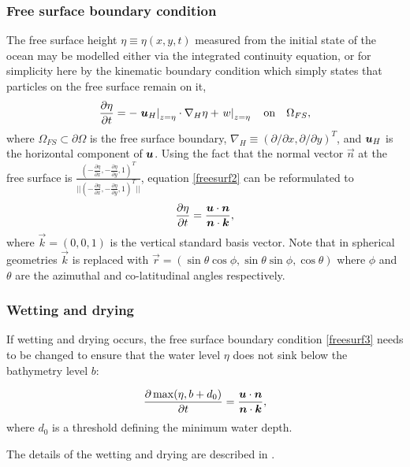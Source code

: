 \subsubsection{Free surface boundary condition}\label{sec:FS}
The free surface height $\eta\equiv\eta(x,y,t)$ measured from the initial state of the ocean
may be modelled either via the integrated continuity equation,
or for simplicity here by the kinematic boundary condition which simply states
that particles on the free surface remain on it, \ie
\begin{equation}\label{freesurf2}
\frac{\partial \eta}{\partial t}=-\left.{{\mbox{\boldmath$u$}}}_H\right|_{z=\eta}\cdot\nabla_H \eta +\left.w\right|_{z=\eta} \quad \textrm{on}\quad \Omega_{FS},
\end{equation}
where $\Omega_{FS}\subset \partial \Omega$ is the free surface boundary, $\nabla_H\equiv(\partial/\partial x,\partial/\partial y)^T$, and
${\mbox{\boldmath$u$}}_H$ is the horizontal component of ${\mbox{\boldmath$u$}}$. Using the fact that the normal vector $\vec n$ at the free surface is $\frac{(-\frac{\partial \eta}{\partial x},-\frac{\partial \eta}{\partial y}, 1)^T}{||(-\frac{\partial \eta}{\partial x},-\frac{\partial \eta}{\partial y}, 1)^T||}$, equation \eqref{freesurf2} can be reformulated to
\begin{equation}\label{freesurf3}
\frac{\partial \eta}{\partial t}=\frac{{\mbox{\boldmath$u$}} \cdot {\mbox{\boldmath$n$}}}{{\mbox{\boldmath$n$}} \cdot {\mbox{\boldmath$k$}}},
\end{equation}
where $\vec k=(0,0,1)$ is the vertical standard basis vector. Note that in spherical geometries $\vec k$ is replaced with
$\vec r=(\sin\theta\cos\phi,\sin\theta\sin\phi,\cos\theta)$ where $\phi$ and $\theta$ are the azimuthal and co-latitudinal angles respectively. 

\subsubsection{Wetting and drying}\label{sec:WD}
If wetting and drying occurs, the free surface boundary condition \ref{freesurf3} needs to be changed to ensure that the water level $\eta$ does not sink below the bathymetry level $b$:

\begin{equation}\label{eq:wd1}
\frac{\partial \max(\eta, b+d_0)}{\partial t}=\frac{{\mbox{\boldmath$u$}} \cdot {\mbox{\boldmath$n$}}}{{\mbox{\boldmath$n$}} \cdot {\mbox{\boldmath$k$}}},
\end{equation}
where $d_0$ is a threshold defining the minimum water depth.

The details of the wetting and drying are described in \cite{Funke2011}.

